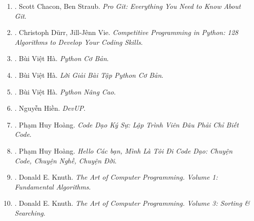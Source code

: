 \documentclass{article}
\begin{document}
\begin{enumerate}
\begin{itemize}
		\item ``The running time of an algorithm on a particular input is the number of instructions \& data accesses executed.''
	\end{itemize}
	{\sf About the Author.} {\sc Thomas H. Cormen} is Emeritus Professor of Computer Science at Dartmouth College. {\sc Charles E. Leiserson} is Edwin Sibley Webster Professor in Electrical Engineering \& Computer Science at MIT. {\sc Ronald L. Rivest} is Institute Professor at MIT. {\sc Clifford Stein} is Wai T. Chang Professor of Industrial Engineering \& Operations Research, \& of Computer Science at Columbia University.
	
	\item \cite{Chacon_Straub2014}. Scott Chacon, Ben Straub. {\it Pro Git: Everything You Need to Know About Git}.\hfill{\sf[reading]}
	
	\item \cite{Durr_Vie2021}. Christoph D\"urr, Jill-J\^enn Vie. {\it Competitive Programming in Python: 128 Algorithms to Develop Your Coding Skills}.
	
	\item \cite{Ha_Python_co_ban}. Bùi Việt Hà. {\it Python Cơ Bản}.\hfill{\sf[done]}
	
	\item \cite{Ha_loi_giai_BT_Python_co_ban}. Bùi Việt Hà. {\it Lời Giải Bài Tập Python Cơ Bản}.\hfill{\sf[reading]}
	
	\item \cite{Ha_Python_nang_cao}. Bùi Việt Hà. {\it Python Nâng Cao}.\hfill{\sf[done]}
	
	\item \cite{Hien_DevUp}. Nguyễn Hiền. {\it DevUP}.\hfill{\sf[done]}
	
	\item \cite{Hoang_code_dao_ky_su}. Phạm Huy Hoàng. {\it Code Dạo Ký Sự: Lập Trình Viên Đâu Phải Chỉ Biết Code}.\hfill{\sf[done]}
	
	\item \cite{Hoang_toi_di_code_dao}. Phạm Huy Hoàng. {\it Hello Các bạn, Mình Là Tôi Đi Code Dạo: Chuyện Code, Chuyện Nghề, Chuyện Đời}.\hfill{\sf[done]}
	
	\item \cite{Knuth1997}. Donald E. Knuth. {\it The Art of Computer Programming. Volume 1: Fundamental Algorithms}.\hfill{\sf[reading]}
	
	\item \cite{Knuth1998}. Donald E. Knuth. {\it The Art of Computer Programming. Volume 3: Sorting \& Searching}.\hfill{\sf[reading]}
	

\end{enumerate}
\end{document}
